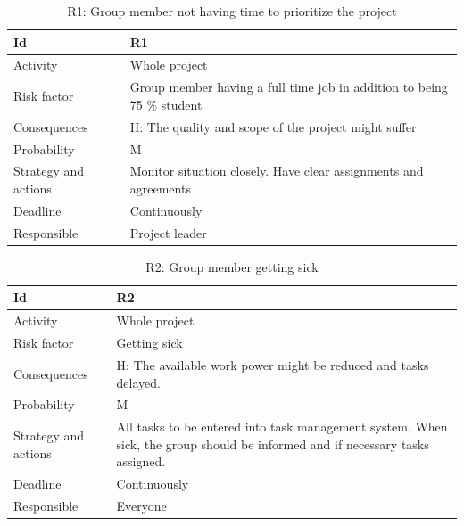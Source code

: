 \documentclass[11pt]{book}
\begin{document}
\begin{table}[H]
\centering
\begin{tabular}{ l  p{11cm} }
    Id                      & R1                                                                          \\ \hline
    Activity                & Whole project                                                              \\ \hline
    Risk factor             & Group member having a full time job in addition to being 75 \% student      \\ \hline
    Consequences            & H: The quality and scope of the project might suffer                        \\ \hline
    Probability             & M                                                                           \\ \hline
    Strategy and actions    & Monitor situation closely. Have clear assignments and agreements            \\ \hline
    Deadline                & Continuously                                                                \\ \hline
    Responsible             & Project leader                                                              \\ 
\end{tabular}
\caption{R1: Group member not having time to prioritize the project}
\label{tab:risk_1}
\end{table}

\begin{table}[H]
\centering
\begin{tabular}{ l  p{11cm} }
    Id                      & R2                                                                          \\ \hline
    Activity                & Whole project                                                              \\ \hline
    Risk factor             & Getting sick                                                                \\ \hline
    Consequences            & H: The available work power might be reduced and tasks delayed.             \\ \hline
    Probability             & M                                                                           \\ \hline
    Strategy and actions    & All tasks to be entered into task management system. 
                              When sick, the group should be informed and if necessary tasks assigned.    \\ \hline
    Deadline                & Continuously                                                                \\ \hline
    Responsible             & Everyone\\
\end{tabular}
\caption{R2: Group member getting sick}
\label{tab:risk_2}
\end{table}
\end{document}
